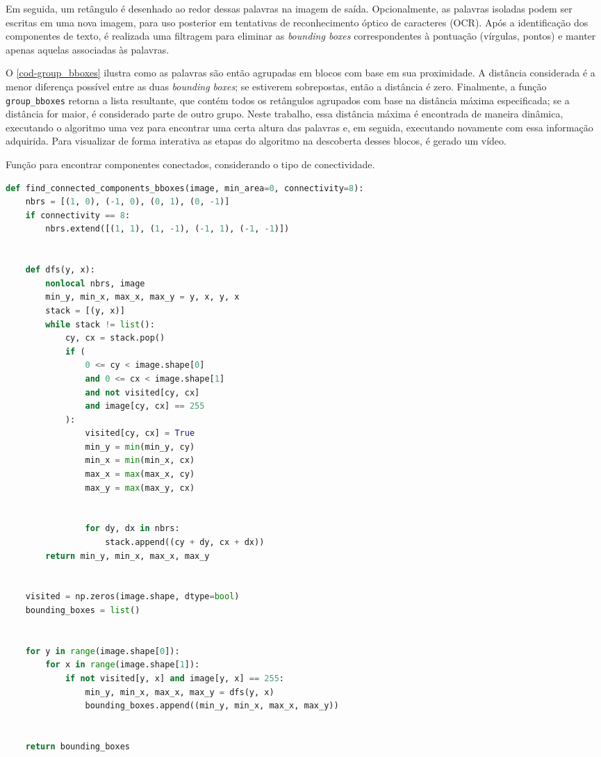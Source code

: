 \documentclass[english, 
               brazil, 
               bsc] %
               {dcomp-abntex2}
\begin{document}
Em seguida, um retângulo é desenhado ao redor dessas palavras na imagem de saída. Opcionalmente, as palavras isoladas podem ser escritas em uma nova imagem, para uso posterior em tentativas de reconhecimento óptico de caracteres (OCR). Após a identificação dos componentes de texto, é realizada uma filtragem para eliminar as \textit{bounding boxes} correspondentes à pontuação (vírgulas, pontos) e manter apenas aquelas associadas às palavras.


O \autoref{cod-group_bboxes} ilustra como as palavras são então agrupadas em blocos com base em sua proximidade. A distância considerada é a menor diferença possível entre as duas \textit{bounding boxes}; se estiverem sobrepostas, então a distância é zero. Finalmente, a função \texttt{group\_bboxes} retorna a lista resultante, que contém todos os retângulos agrupados com base na distância máxima especificada; se a distância for maior, é considerado parte de outro grupo. Neste trabalho, essa distância máxima é encontrada de maneira dinâmica, executando o algoritmo uma vez para encontrar uma certa altura das palavras e, em seguida, executando novamente com essa informação adquirida. Para visualizar de forma interativa as etapas do algoritmo na descoberta desses blocos, é gerado um vídeo.




\begin{codigo}[h]
  \caption{\small Função para encontrar componentes conectados, considerando o tipo de conectividade.}
 \label{cod-findcomp}
\begin{lstlisting}[language=python]
def find_connected_components_bboxes(image, min_area=0, connectivity=8):
    nbrs = [(1, 0), (-1, 0), (0, 1), (0, -1)]
    if connectivity == 8:
        nbrs.extend([(1, 1), (1, -1), (-1, 1), (-1, -1)])


    def dfs(y, x):
        nonlocal nbrs, image
        min_y, min_x, max_x, max_y = y, x, y, x
        stack = [(y, x)]
        while stack != list():
            cy, cx = stack.pop()
            if (
                0 <= cy < image.shape[0]
                and 0 <= cx < image.shape[1]
                and not visited[cy, cx]
                and image[cy, cx] == 255
            ):
                visited[cy, cx] = True
                min_y = min(min_y, cy)
                min_x = min(min_x, cx)
                max_x = max(max_x, cy)
                max_y = max(max_y, cx)


                for dy, dx in nbrs:
                    stack.append((cy + dy, cx + dx))
        return min_y, min_x, max_x, max_y


    visited = np.zeros(image.shape, dtype=bool)
    bounding_boxes = list()


    for y in range(image.shape[0]):
        for x in range(image.shape[1]):
            if not visited[y, x] and image[y, x] == 255:
                min_y, min_x, max_x, max_y = dfs(y, x)
                bounding_boxes.append((min_y, min_x, max_x, max_y))


    return bounding_boxes


\end{lstlisting}
\end{codigo}
\end{document}
